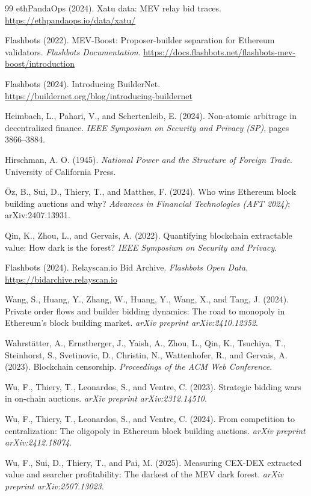 \documentclass[11pt]{article}
\begin{document}
\begin{thebibliography}{99}
ethPandaOps (2024).
Xatu data: MEV relay bid traces.
\url{https://ethpandaops.io/data/xatu/}

Flashbots (2022).
MEV-Boost: Proposer-builder separation for Ethereum validators.
\textit{Flashbots Documentation}.
\url{https://docs.flashbots.net/flashbots-mev-boost/introduction}

Flashbots (2024).
Introducing BuilderNet.
\url{https://buildernet.org/blog/introducing-buildernet}

Heimbach, L., Pahari, V., and Schertenleib, E. (2024).
Non-atomic arbitrage in decentralized finance.
\textit{IEEE Symposium on Security and Privacy (SP)}, pages 3866--3884.

Hirschman, A. O. (1945).
\textit{National Power and the Structure of Foreign Trade}.
University of California Press.

\"Oz, B., Sui, D., Thiery, T., and Matthes, F. (2024).
Who wins Ethereum block building auctions and why?
\textit{Advances in Financial Technologies (AFT 2024)}; arXiv:2407.13931.

Qin, K., Zhou, L., and Gervais, A. (2022).
Quantifying blockchain extractable value: How dark is the forest?
\textit{IEEE Symposium on Security and Privacy}.

Flashbots (2024).
Relayscan.io Bid Archive.
\textit{Flashbots Open Data}.
\url{https://bidarchive.relayscan.io}

Wang, S., Huang, Y., Zhang, W., Huang, Y., Wang, X., and Tang, J. (2024).
Private order flows and builder bidding dynamics: The road to monopoly in
Ethereum's block building market.
\textit{arXiv preprint arXiv:2410.12352}.

Wahrst\"atter, A., Ernstberger, J., Yaish, A., Zhou, L., Qin, K.,
Tsuchiya, T., Steinhorst, S., Svetinovic, D., Christin, N., Wattenhofer, R.,
and Gervais, A. (2023).
Blockchain censorship.
\textit{Proceedings of the ACM Web Conference}.

Wu, F., Thiery, T., Leonardos, S., and Ventre, C. (2023).
Strategic bidding wars in on-chain auctions.
\textit{arXiv preprint arXiv:2312.14510}.

Wu, F., Thiery, T., Leonardos, S., and Ventre, C. (2024).
From competition to centralization: The oligopoly in Ethereum block building
auctions.
\textit{arXiv preprint arXiv:2412.18074}.

Wu, F., Sui, D., Thiery, T., and Pai, M. (2025).
Measuring CEX-DEX extracted value and searcher profitability: The darkest of
the MEV dark forest.
\textit{arXiv preprint arXiv:2507.13023}.

\end{thebibliography}
\end{document}
